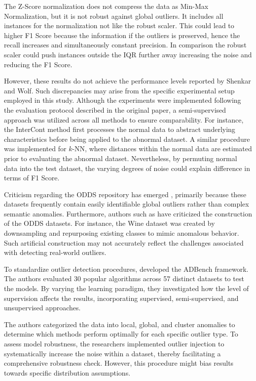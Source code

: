 The Z-Score normalization does not compress the data as Min-Max Normalization, but it is not robust against global outliers. 
It includes all instances for the normalization not like the robust scaler.
This could lead to higher F1 Score because the information if the outliers is preserved, hence the recall increases and simultaneously constant precision.
In comparison the robust scaler could push instances outside the IQR further away increasing the noise and reducing the F1 Score.


However, these results do not achieve the performance levels reported by Shenkar and Wolf. 
Such discrepancies may arise from the specific experimental setup employed in this study. 
Although the experiments were implemented following the evaluation protocol described in the original paper, a semi-supervised approach was utilized across all methods to ensure comparability. 
For instance, the InterCont method first processes the normal data to abstract underlying characteristics before being applied to the abnormal dataset. 
A similar procedure was implemented for $k$-NN, where distances within the normal data are estimated prior to evaluating the abnormal dataset.
Nevertheless, by permuting normal data into the test dataset, the varying degrees of noise could explain difference in terms of F1 Score.


Criticism regarding the ODDS repository has emerged \citep[p. 923]{campos2016evaluation}, primarily because these datasets frequently contain easily identifiable global outliers rather than complex semantic anomalies. 
Furthermore, authors such as \citet{han2022adbench} have criticized the construction of the ODDS datasets.
For instance, the Wine dataset was created by downsampling and repurposing existing classes to mimic anomalous behavior. 
Such artificial construction may not accurately reflect the challenges associated with detecting real-world outliers.

To standardize outlier detection procedures, \citet{han2022adbench} developed the ADBench framework. 
The authors evaluated 30 popular algorithms across 57 distinct datasets to test the models. 
By varying the learning paradigm, they investigated how the level of supervision affects the results, incorporating supervised, semi-supervised, and unsupervised approaches.


The authors categorized the data into local, global, and cluster anomalies to determine which methods perform optimally for each specific outlier type. 
To assess model robustness, the researchers implemented outlier injection to systematically increase the noise within a dataset, thereby facilitating a comprehensive robustness check.
However, this procedure might bias results towards specific distribution assumptions.


